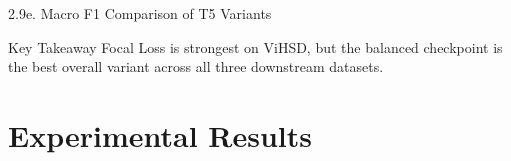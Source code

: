 \documentclass[11pt, aspectratio=169]{beamer}
\begin{document}
\begin{frame}[shrink=8]{2.9e. Macro F1 Comparison of T5 Variants}

\begin{table}[h]
  \centering
  \caption{Macro F1 on three independent downstream datasets}
  \vspace{0.15cm}
\end{table}

\vspace{0.2cm}
\begin{block}{Key Takeaway}
  Focal Loss is strongest on ViHSD, but the balanced checkpoint is the best overall variant across all three downstream datasets.
\end{block}
\end{frame}

\section{Experimental Results}
\end{document}
